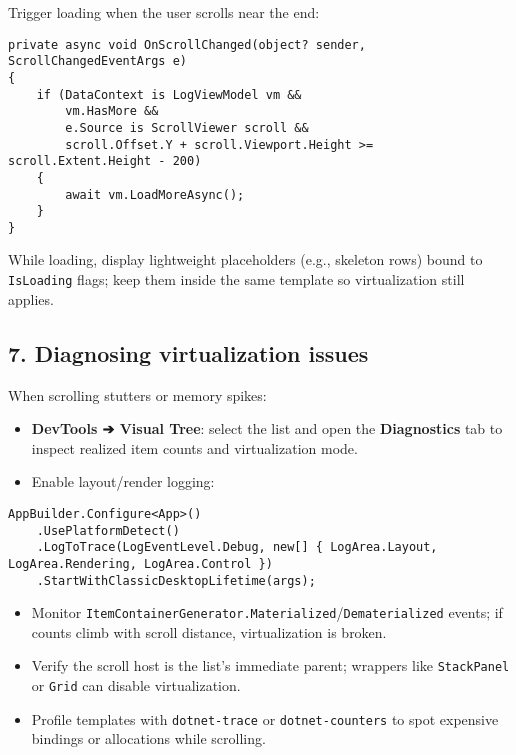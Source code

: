Trigger loading when the user scrolls near the end:

\begin{lstlisting}
private async void OnScrollChanged(object? sender, ScrollChangedEventArgs e)
{
    if (DataContext is LogViewModel vm &&
        vm.HasMore &&
        e.Source is ScrollViewer scroll &&
        scroll.Offset.Y + scroll.Viewport.Height >= scroll.Extent.Height - 200)
    {
        await vm.LoadMoreAsync();
    }
}
\end{lstlisting}

While loading, display lightweight placeholders (e.g., skeleton rows)
bound to \passthrough{\lstinline!IsLoading!} flags; keep them inside the
same template so virtualization still applies.

\subsection{7. Diagnosing virtualization
issues}\label{diagnosing-virtualization-issues}

When scrolling stutters or memory spikes:

\begin{itemize}
\tightlist
\item
  \textbf{DevTools ➔ Visual Tree}: select the list and open the
  \textbf{Diagnostics} tab to inspect realized item counts and
  virtualization mode.
\item
  Enable layout/render logging:
\end{itemize}

\begin{lstlisting}
AppBuilder.Configure<App>()
    .UsePlatformDetect()
    .LogToTrace(LogEventLevel.Debug, new[] { LogArea.Layout, LogArea.Rendering, LogArea.Control })
    .StartWithClassicDesktopLifetime(args);
\end{lstlisting}

\begin{itemize}
\tightlist
\item
  Monitor
  \passthrough{\lstinline!ItemContainerGenerator.Materialized!}/\passthrough{\lstinline!Dematerialized!}
  events; if counts climb with scroll distance, virtualization is
  broken.
\item
  Verify the scroll host is the list's immediate parent; wrappers like
  \passthrough{\lstinline!StackPanel!} or \passthrough{\lstinline!Grid!}
  can disable virtualization.
\item
  Profile templates with \passthrough{\lstinline!dotnet-trace!} or
  \passthrough{\lstinline!dotnet-counters!} to spot expensive bindings
  or allocations while scrolling.
\end{itemize}

